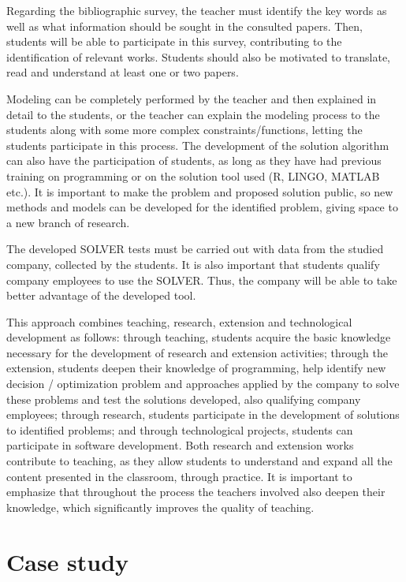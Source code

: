 \documentclass[preprint,12pt,authoryear]{elsarticle}
\begin{document}
Regarding the bibliographic survey, the teacher must identify the key words as well as what information should be sought in the consulted papers. Then, students will be able to participate in this survey, contributing to the identification of relevant works. Students should also be motivated to translate, read and understand at least one or two papers. 

Modeling can be completely performed by the teacher and then explained in detail to the students, or the teacher can explain the modeling process to the students along with some more complex constraints/functions, letting the students participate in this process. The development of the solution algorithm can also have the participation of students, as long as they have had previous training on programming or on the solution tool used (R, LINGO, MATLAB etc.). It is important to make the problem and proposed solution public, so new methods and models can be developed for the identified problem, giving space to a new branch of research. 

The developed SOLVER tests must be carried out with data from the studied company, collected by the students. It is also important that students qualify company employees to use the SOLVER. Thus, the company will be able to take better advantage of the developed tool.

This approach combines teaching, research, extension and technological development as follows: through teaching, students acquire the basic knowledge necessary for the development of research and extension activities; through the extension, students deepen their knowledge of programming, help identify new decision / optimization problem and approaches applied by the company to solve these problems and test the solutions developed, also qualifying company employees; through research, students participate in the development of solutions to identified problems; and through technological projects, students can participate in software development. Both research and extension works contribute to teaching, as they allow students to understand and expand all the content
presented in the classroom, through practice. It is important to emphasize that throughout the process the teachers involved also deepen their knowledge, which significantly improves the quality of teaching.

\section{Case study}
\label{}
\end{document}
